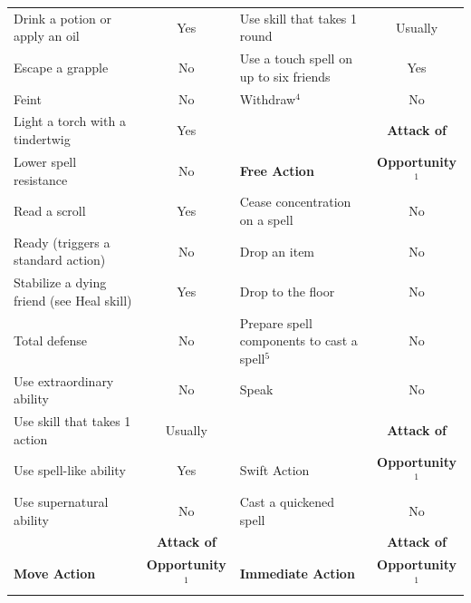 \begin{table}[]
\begin{tabular}{lclc}
Drink a potion or apply an oil                   & Yes                   & Use skill that takes 1 round              & Usually               \\
Escape a grapple                                 & No                    & Use a touch spell on up to six friends    & Yes                   \\
Feint                                            & No                    & Withdraw\(^{4}\)                          & No                    \\
Light a torch with a tindertwig                  & Yes                   &                                           & \textbf{Attack of}    \\
Lower spell resistance                           & No                    & \textbf{Free Action}                      & \textbf{Opportunity\(^{1}\)} \\
Read a scroll                                    & Yes                   & Cease concentration on a spell            & No                    \\
Ready (triggers a standard action)               & No                    & Drop an item                              & No                    \\
Stabilize a dying friend (see Heal skill)        & Yes                   & Drop to the floor                         & No                    \\
Total defense                                    & No                    & Prepare spell components to cast a spell\(^{5}\) & No                    \\
Use extraordinary ability                        & No                    & Speak                                     & No                    \\
Use skill that takes 1 action                    & Usually               &                                           & \textbf{Attack of}    \\
Use spell-like ability                           & Yes                   & Swift Action                              & \textbf{Opportunity\(^{1}\)} \\
Use supernatural ability                         & No                    & Cast a quickened spell                    & No                    \\
                                                 & \textbf{Attack of}    &                                           & \textbf{Attack of}    \\
\textbf{Move Action}                             & \textbf{Opportunity\(^{1}\)} & \textbf{Immediate Action}          & \textbf{Opportunity\(^{1}\)} \\

\end{tabular}
\end{table}

